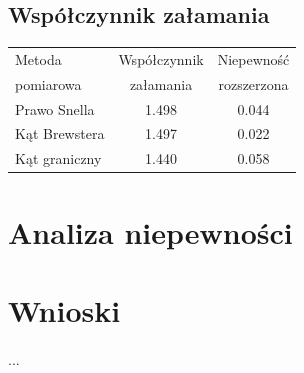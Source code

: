 \documentclass[a4paper,10pt]{article}
\begin{document}
\subsection{Współczynnik załamania}
\begin{tabular}{|l|c|c|}
  \hline
  Metoda & Współczynnik &Niepewność \\
  pomiarowa & załamania & rozszerzona\\\hline
  Prawo Snella & 1.498 & 0.044 \\\hline
  Kąt Brewstera& 1.497 & 0.022 \\\hline
  Kąt graniczny& 1.440 & 0.058 \\\hline
\end{tabular}

\section{Analiza niepewności}

\section{Wnioski}
\paragraph{}...
\end{document}
